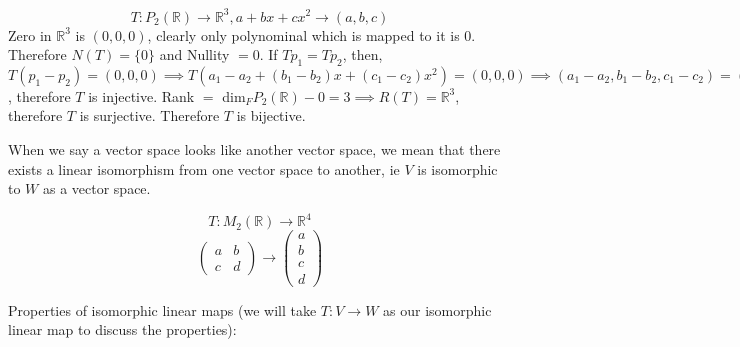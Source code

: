 \documentclass[11pt,a4paper]{colorart}
\def\l{\left}
\def\r{\right}
\def\d{{\rm d}}
\def\R{\mathbb{R}}
\def\b{\beta}
\begin{document}
\begin{example}
	\[T:P_2\l(\R\r)\rightarrow \R^3, a+bx+cx^2\rightarrow\l(a,b,c\r)\]
	Zero in $\R^3$ is $\l(0,0,0\r)$, clearly only polynominal which is mapped to it is 0. Therefore $N\l(T\r) = \{0\}$ and Nullity $=0$. If $Tp_1=Tp_2$, then, $T\l(p_1-p_2\r)=\l(0,0,0\r) \implies T\l(a_1-a_2+\l(b_1-b_2\r)x+\l(c_1-c_2\r)x^2\r)=\l(0,0,0\r) \implies\l(a_1-a_2,b_1-b_2,c_1-c_2\r)=\l(0,0,0\r)\implies a_1=a_2,b_1=b_2,c_1=c_2\implies p_1=p_2$, therefore $T$ is injective. Rank $=$ dim$_FP_2\l(\R\r) - 0 = 3 \implies R\l(T\r)=\R^3$, therefore $T$ is surjective. Therefore $T$ is bijective.
\end{example}

\begin{remark}
	When we say a vector space looks like another vector space, we mean that there exists a linear isomorphism from one vector space to another, ie $V$ is isomorphic to $W$ as a vector space.
\end{remark}

\begin{example}
	\[ T: M_2 \l( \R \r) \rightarrow \R^4 \]
	\[ \begin{pmatrix} a & b \\ c & d \end{pmatrix} \rightarrow
	   \begin{pmatrix} a \\b \\ c \\d \end{pmatrix} \]
\end{example}

Properties of isomorphic linear maps (we will take $T:V\rightarrow W$ as our isomorphic linear map to discuss the properties):
\end{document}
